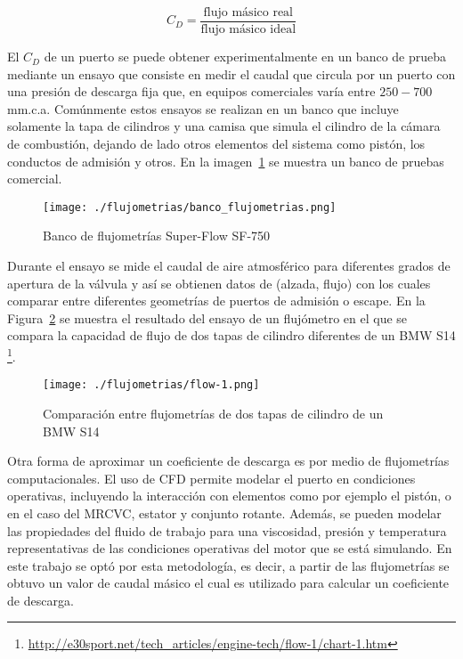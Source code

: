 \begin{equation}
  C_{D} = \frac{\text{flujo másico real}}{\text{flujo másico ideal}}
\end{equation}

El $C_{D}$ de un puerto se puede obtener experimentalmente en un banco de prueba
mediante un ensayo que consiste en medir el caudal que circula por un puerto con
una presión de descarga fija que, en equipos comerciales varía entre $250-700$
mm.c.a.
%
Comúnmente estos ensayos se realizan en un banco que incluye solamente la tapa
de cilindros y una camisa que simula el cilindro de la cámara de combustión,
dejando de lado otros elementos del sistema como pistón, los conductos de
admisión y otros.
%
En la imagen~\ref{fig:banco_flujometrias} se muestra un banco de pruebas
comercial.

\begin{figure} \centering
\texttt{[image: ./flujometrias/banco\_flujometrias.png]}
  \caption{Banco de flujometrías Super-Flow SF-750}\label{fig:banco_flujometrias}
\end{figure}

Durante el ensayo se mide el caudal de aire atmosférico para diferentes grados
de apertura de la válvula y así se obtienen datos de (alzada, flujo) con los
cuales comparar entre diferentes geometrías de puertos de admisión o escape.
%
En la Figura~\ref{fig:flow-1} se muestra el resultado del ensayo de un
flujómetro en el que se compara la capacidad de flujo de dos tapas de cilindro
diferentes de un BMW S14
\footnote{\url{http://e30sport.net/tech_articles/engine-tech/flow-1/chart-1.htm}}.

\begin{figure} \centering
\texttt{[image: ./flujometrias/flow-1.png]}
  \caption{Comparación entre flujometrías de dos tapas de cilindro de un BMW S14}\label{fig:flow-1}
\end{figure}

Otra forma de aproximar un coeficiente de descarga es por medio de flujometrías
computacionales.
%
El uso de CFD permite modelar el puerto en condiciones operativas, incluyendo
la interacción con elementos como por ejemplo el pistón, o en el caso del
MRCVC, estator y conjunto rotante.
%
Además, se pueden modelar las propiedades del fluido de trabajo para una
viscosidad, presión y temperatura representativas de las condiciones operativas
del motor que se está simulando.
%
En este trabajo se optó por esta metodología, es decir, a partir de las flujometrías se
obtuvo un valor de caudal másico el cual es utilizado para calcular un
coeficiente de descarga.

